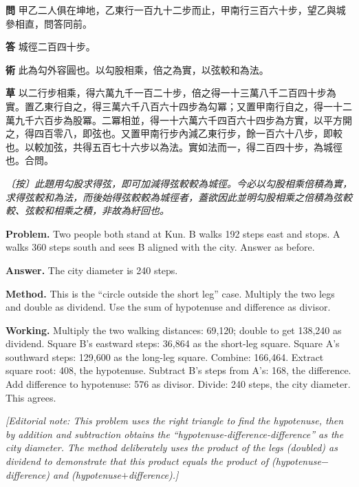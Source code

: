 \documentclass[11pt,a4paper]{article}
\newlength{\chwidth}
\newlength{\enwidth}
\newcommand{\zh}[1]{{\CJKfamily{sf}#1}}
\newenvironment{bilingual}{%
  \noindent
  \begin{minipage}[t]{\chwidth}%
  \small
}{%
  \end{minipage}%
}
\newcommand{\switchcolumn}{%
  \end{minipage}%
  \hfill%
  \begin{minipage}[t]{\enwidth}%
  \small
}
\begin{document}
\begin{bilingual}
\noindent\textbf{\zh{問}} \zh{甲乙二人俱在坤地，乙東行一百九十二步而止，甲南行三百六十步，望乙與城參相直，問答同前。}

\vspace{0.2cm}
\noindent\textbf{\zh{答}} \zh{城徑二百四十步。}

\vspace{0.2cm}
\noindent\textbf{\zh{術}} \zh{此為勾外容圓也。以勾股相乘，倍之為實，以弦較和為法。}

\vspace{0.2cm}
\noindent\textbf{\zh{草}} \zh{以二行步相乘，得六萬九千一百二十步，倍之得一十三萬八千二百四十步為實。置乙東行自之，得三萬六千八百六十四步為勾冪；又置甲南行自之，得一十二萬九千六百步為股冪。二冪相並，得一十六萬六千四百六十四步為方實，以平方開之，得四百零八，即弦也。又置甲南行步內減乙東行步，餘一百六十八步，即較也。以較加弦，共得五百七十六步以為法。實如法而一，得二百四十步，為城徑也。合問。}

\vspace{0.2cm}
\noindent\textit{\zh{〔按〕此題用勾股求得弦，即可加減得弦較較為城徑。今必以勾股相乘倍積為實，求得弦較和為法，而後始得弦較較為城徑者，蓋欲因此並明勾股相乘之倍積為弦較較、弦較和相乘之積，非故為紆回也。}}

\switchcolumn

\noindent\textbf{Problem.} Two people both stand at Kun. B walks 192 steps east and stops. A walks 360 steps south and sees B aligned with the city. Answer as before.

\vspace{0.2cm}
\noindent\textbf{Answer.} The city diameter is 240 steps.

\vspace{0.2cm}
\noindent\textbf{Method.} This is the ``circle outside the short leg'' case. Multiply the two legs and double as dividend. Use the sum of hypotenuse and difference as divisor.

\vspace{0.2cm}
\noindent\textbf{Working.} Multiply the two walking distances: 69,120; double to get 138,240 as dividend. Square B's eastward steps: 36,864 as the short-leg square. Square A's southward steps: 129,600 as the long-leg square. Combine: 166,464. Extract square root: 408, the hypotenuse. Subtract B's steps from A's: 168, the difference. Add difference to hypotenuse: 576 as divisor. Divide: 240 steps, the city diameter. This agrees.

\vspace{0.2cm}
\noindent\textit{[Editorial note: This problem uses the right triangle to find the hypotenuse, then by addition and subtraction obtains the ``hypotenuse-difference-difference'' as the city diameter. The method deliberately uses the product of the legs (doubled) as dividend to demonstrate that this product equals the product of (hypotenuse$-$difference) and (hypotenuse$+$difference).]}
\end{bilingual}
\end{document}
